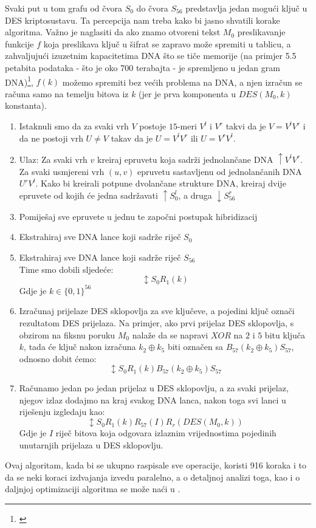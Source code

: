 \documentclass[a4paper,oneside,12pt]{memoir} %
\begin{document}
\begin{spacing}{1.5}
Svaki put u tom grafu od čvora $S_0$ do čvora $S_{56}$ predstavlja jedan mogući ključ u DES kriptosustavu. Ta percepcija nam treba kako bi jasno shvatili korake algoritma. Važno je naglasiti da ako znamo otvoreni tekst $M_0$ preslikavanje funkcije $f$ koja preslikava ključ u šifrat se zapravo može spremiti u tablicu, a zahvaljujući izuzetnim kapacitetima DNA što se tiče memorije (na primjer 5.5 petabita podataka - što je oko 700 terabajta - je spremljeno u jedan gram DNA)\footnote{\cite{Church}}, $f(k)$ možemo spremiti bez većih problema na DNA, a njen izračun se računa samo na temelju bitova iz $k$ (jer je prva komponenta u $DES(M_0,k)$ konstanta).
\begin{enumerate}
\item Istaknuli smo da za svaki vrh $V$ postoje $15$-meri $V^l$ i $V^r$ takvi da je $V=V^lV^r$ i da ne postoji vrh $U \neq V$ takav da je $U=V^lV^r$ ili $U=V^rV^l$.
\item  Ulaz: Za svaki vrh $v$ kreiraj epruvetu koja sadrži jednolančane DNA $\uparrow V^lV^r$. Za svaki usmjereni vrh $(u,v)$ epruvetu sastavljenu  od jednolančanih DNA $U^rV^l$. Kako bi kreirali potpune dvolančane strukture DNA, kreiraj dvije epruvete od kojih će jedna sadržavati $\uparrow S_0 ^l$, a druga $\downarrow S_{56}^r$
\item Pomiješaj sve epruvete u jednu te započni postupak hibridizacij
\item Ekstrahiraj sve DNA lance koji sadrže riječ $S_0$
\item Ekstrahiraj sve DNA lance koji sadrže riječ $S_{56}$\\
Time smo dobili sljedeće:
\[\updownarrow S_0R_1(k)\]
Gdje je $k \in \{0,1\}^{56}$
\item Izračunaj prijelaze DES sklopovlja za sve ključeve, a pojedini ključ označi rezultatom DES prijelaza. Na primjer, ako prvi prijelaz DES sklopovlja, s obzirom na fiksnu poruku $M_0$ nalaže da se napravi $XOR$ na $2$ i $5$ bitu ključa $k$, tada će ključ nakon izračuna $k_2 \oplus k_5$ biti označen sa $B_{57}(k_2 \oplus k_5)S_{57}$, odnosno dobit ćemo:
\[\updownarrow S_0R_1(k)B_{57}(k_2 \oplus k_5)S_{57}\] 
\item Računamo jedan po jedan prijelaz u DES sklopovlju, a za svaki prijelaz, njegov izlaz dodajmo na kraj svakog DNA lanca, nakon toga svi lanci u riješenju izgledaju kao:
\[\updownarrow S_0R_1(k)R_{57}(I)R_r(DES(M_0,k))\]
Gdje je $I$ riječ bitova koja odgovara izlaznim vrijednostima pojedinih unutarnjih prijelaza u DES sklopovlju. 
\end{enumerate} 
Ovaj algoritam, kada bi se ukupno raspisale sve operacije, koristi 916 koraka i to da se neki koraci izdvajanja izvedu paralelno, a o detaljnoj analizi toga, kao i o daljnjoj optimizaciji algoritma se može naći u \cite{DESbreak}.
\newpage

\end{spacing}
\end{document}
